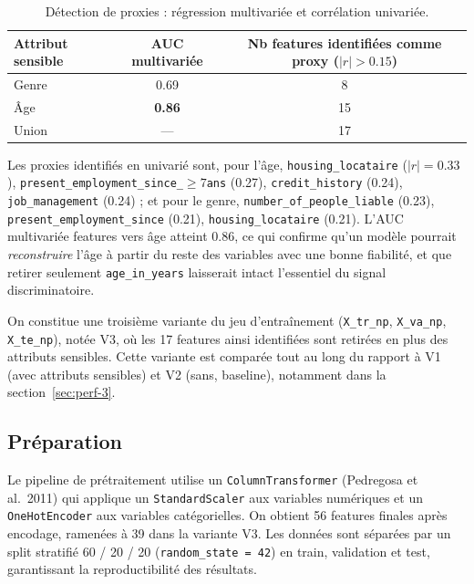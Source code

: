 \documentclass[11pt, a4paper]{article}
\begin{document}
\begin{table}[H]
\centering
\begin{tabular}{lcc}
\toprule
\textbf{Attribut sensible} & \textbf{AUC multivariée} & \textbf{Nb features identifiées comme proxy} ($|r|>0.15$) \\
\midrule
Genre & 0.69 & 8 \\
Âge   & \textbf{0.86} & 15 \\
\midrule
Union & --- & 17 \\
\bottomrule
\end{tabular}
\caption{Détection de proxies : régression multivariée et corrélation univariée.}
\end{table}

Les proxies identifiés en univarié sont, pour l'âge, \texttt{housing\_locataire} ($|r|=0.33$), \texttt{present\_employment\_since\_$\geq 7$ans} (0.27), \texttt{credit\_history} (0.24), \texttt{job\_management} (0.24) ; et pour le genre, \texttt{number\_of\_people\_liable} (0.23), \texttt{present\_employment\_since} (0.21), \texttt{housing\_locataire} (0.21). L'AUC multivariée features vers âge atteint 0.86, ce qui confirme qu'un modèle pourrait \emph{reconstruire} l'âge à partir du reste des variables avec une bonne fiabilité, et que retirer seulement \texttt{age\_in\_years} laisserait intact l'essentiel du signal discriminatoire.

\begin{leconbox}
On constitue une troisième variante du jeu d'entraînement (\texttt{X\_tr\_np}, \texttt{X\_va\_np}, \texttt{X\_te\_np}), notée V3, où les 17 features ainsi identifiées sont retirées en plus des attributs sensibles. Cette variante est comparée tout au long du rapport à V1 (avec attributs sensibles) et V2 (sans, baseline), notamment dans la section~\ref{sec:perf-3}.
\end{leconbox}

\subsection{Préparation}

Le pipeline de prétraitement utilise un \texttt{ColumnTransformer} (Pedregosa et al.\ 2011) qui applique un \texttt{StandardScaler} aux variables numériques et un \texttt{OneHotEncoder} aux variables catégorielles. On obtient 56 features finales après encodage, ramenées à 39 dans la variante V3. Les données sont séparées par un split stratifié 60 / 20 / 20 (\texttt{random\_state = 42}) en train, validation et test, garantissant la reproductibilité des résultats.
\end{document}
